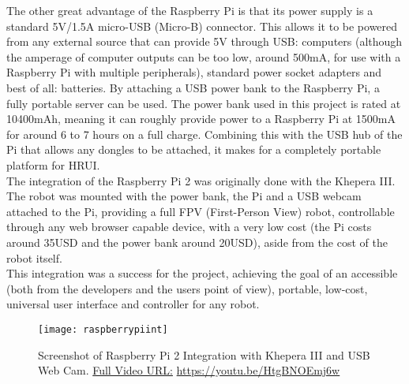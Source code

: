 The other great advantage of the Raspberry Pi is that its power supply is a standard 5V/1.5A micro-USB (Micro-B) connector. This allows 
it to be powered from any external source that can provide 5V through USB: computers (although the amperage of computer outputs can be 
too low, around 500mA, for use with a Raspberry Pi with multiple peripherals), standard power socket adapters and best of all: 
batteries. By attaching a USB power bank to the Raspberry Pi, a fully portable server can be used. The power bank used in this project 
is rated at 10400mAh, meaning it can roughly provide power to a Raspberry Pi at 1500mA for around 6 to 7 hours on a full charge. 
Combining this with the USB hub of the Pi that allows any dongles to be attached, it makes for a completely portable platform for HRUI.\\

The integration of the Raspberry Pi 2 was originally done with the Khepera III. The robot was mounted with the power bank, the Pi and a 
USB webcam attached to the Pi, providing a full FPV (First-Person View) robot, controllable through any web browser capable device, with 
a very low cost (the Pi costs around 35USD and the power bank around 20USD), aside from the cost of the robot itself.\\

This integration was a success for the project, achieving the goal of an accessible (both from the developers and the users point of
view), portable, low-cost, universal user interface and controller for any robot.
\begin{figure}[H]
\centering
\captionsetup{justification=centering}
\texttt{[image: raspberrypiint]}
\caption{Screenshot of Raspberry Pi 2 Integration with Khepera III and USB Web Cam. 
\href{https://www.youtube.com/watch?v=HtgBNOEmj6w}{Full Video URL:} \url{https://youtu.be/HtgBNOEmj6w}\label{kheperaiiidemo}}
\end{figure}